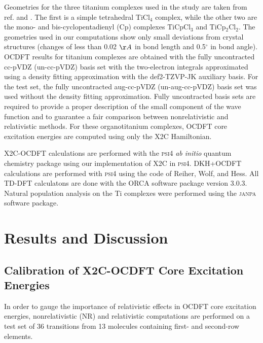 \documentclass{article}
\begin{document}
Geometries for the three titanium complexes used in the study are taken from ref. and .  The first is a simple tetrahedral TiCl$_4$ complex, while the other two are the mono- and bis-cyclopentadienyl (Cp) complexes TiCpCl$_3$ and TiCp$_2$Cl$_2$. The geometries used in our computations show only small deviations from crystal structures (changes of less than 0.02 $\AA$ in bond length and 0.5$^{\circ}$ in bond angle). OCDFT results for titanium complexes are obtained with the fully uncontracted cc-pVDZ\cite{cc-pvdz-dk-Al-Ar,cc-pvdz-dk-H-Ne} (un-cc-pVDZ) basis set with the two-electron integrals approximated using a density fitting approximation\cite{DF-def2-TZVP-JK,DF-def2-TZVP-JK-1,BAERENDS197341,B000027M,DF-SABIN} with the def2-TZVP-JK auxiliary basis\cite{JCC20702}. For the test set, the fully uncontracted  aug-cc-pVDZ\cite{aug-cc-pvdz-B-F}  (un-aug-cc-pVDZ) basis set was used without the density fitting approximation.
Fully uncontracted basis sets are required to provide a proper description of the small component of the wave function and to guarantee a fair comparison between nonrelativistic and relativistic methods. For these organotitanium complexes, OCDFT core excitation energies are computed using only the X2C Hamiltonian.

 X2C-OCDFT calculations are performed with the \textsc{psi4} \textit{ab initio} quantum chemistry package\cite{PSI4} using our implementation of X2C in \textsc{psi4}.  DKH+OCDFT calculations are performed with \textsc{psi4} using the code of Reiher, Wolf, and Hess\cite{DKHn-Reiher,DKH}. All TD-DFT calculatons are done with the ORCA software package version 3.0.3\cite{ORCA}. Natural population analysis on the Ti complexes were performed using the \textsc{janpa}\cite{nikolaienko_janpa:_2014} software package.

\section{Results and Discussion}
\label{sec:calibration}
\subsection{Calibration of X2C-OCDFT Core Excitation Energies}
In order to gauge the importance of relativistic effects in OCDFT core excitation energies, nonrelativistic (NR) and relativistic computations are performed on a test set of 36 transitions from 13 molecules containing first- and second-row elements. 
\end{document}
